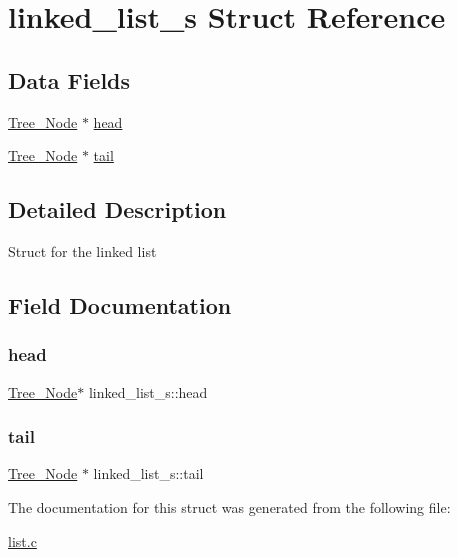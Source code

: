 \hypertarget{structlinked__list__s}{}\section{linked\+\_\+list\+\_\+s Struct Reference}
\label{structlinked__list__s}
\subsection*{Data Fields}
\begin{DoxyCompactItemize}
\item 
\mbox{\hyperlink{list_8h_a68f0ccc88265f29ccc7b9c8133456b67}{Tree\+\_\+\+Node}} $\ast$ \mbox{\hyperlink{structlinked__list__s_a0068ba2c85ca778a92fde78351d82da8}{head}}
\item 
\mbox{\hyperlink{list_8h_a68f0ccc88265f29ccc7b9c8133456b67}{Tree\+\_\+\+Node}} $\ast$ \mbox{\hyperlink{structlinked__list__s_a5da77ab33ae10b1264a08bee2d14d016}{tail}}
\end{DoxyCompactItemize}


\subsection{Detailed Description}
Struct for the linked list 

\subsection{Field Documentation}
\mbox{\label{structlinked__list__s_a0068ba2c85ca778a92fde78351d82da8}} 
\subsubsection{\texorpdfstring{head}{head}}
{\footnotesize\ttfamily \mbox{\hyperlink{list_8h_a68f0ccc88265f29ccc7b9c8133456b67}{Tree\+\_\+\+Node}}$\ast$ linked\+\_\+list\+\_\+s\+::head}

\mbox{\label{structlinked__list__s_a5da77ab33ae10b1264a08bee2d14d016}} 
\subsubsection{\texorpdfstring{tail}{tail}}
{\footnotesize\ttfamily \mbox{\hyperlink{list_8h_a68f0ccc88265f29ccc7b9c8133456b67}{Tree\+\_\+\+Node}} $\ast$ linked\+\_\+list\+\_\+s\+::tail}



The documentation for this struct was generated from the following file\+:\begin{DoxyCompactItemize}
\item 
\mbox{\hyperlink{list_8c}{list.\+c}}\end{DoxyCompactItemize}
